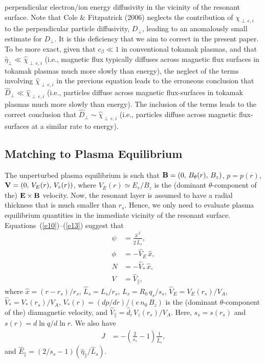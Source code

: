\documentclass[12pt,prb,aps]{revtex4-1}
\begin{document}
perpendicular electron/ion  energy diffusivity in the vicinity of the resonant surface. 
Note that Cole \& Fitzpatrick (2006) neglects the contribution of $\chi_{\perp\,e,i}$ to the perpendicular particle
diffusivity, $D_\perp$, leading to an anomalously small estimate for $D_\perp$. It is this deficiency that we aim to
correct in the present paper. To be more exact, given that $c_\beta\ll 1$ in conventional tokamak plasmas, and
that $\hat{\eta}_\perp\ll \hat{\chi}_{\perp\,e,i}$ (i.e., magnetic flux typically diffuses  across magnetic flux surfaces in tokamak plasmas much more
slowly than energy), the neglect of the terms involving $\hat{\chi}_{\perp\,e,i}$ in the previous equation leads to the
erroneous conclusion that $\hat{D}_\perp\ll \hat{\chi}_{\perp\,e,i}$ (i.e., particles diffuse across magnetic flux-surfaces in tokamak plasmas 
much more slowly than energy). The inclusion of the terms leads to the correct conclusion that  $\hat{D}_\perp\sim \hat{\chi}_{\perp\,e,i}$ (i.e., particles diffuse across magnetic flux-surfaces 
at a similar rate to energy). 

\subsection{Matching to Plasma Equilibrium}
The unperturbed plasma equilibrium is such that
${\bf B} = (0,\,B_\theta(r),\,B_z)$,  $p = p(r)$,
${\bf V} = (0,\,V_E(r),\,V_z(r))$,
where 
$V_E(r)\simeq E_r/B_z$
 is the (dominant $\theta$-component of the) ${\bf E}\times {\bf B}$ velocity. Now, the resonant layer is assumed to have a radial thickness that is
much smaller than $r_s$.   Hence, we only need to evaluate plasma equilibrium quantities in the immediate vicinity of the resonant
surface. Equations~(\ref{e10})--(\ref{e13}) suggest that 
\begin{align}
\psi&= \frac{\hat{x}^{\,2}}{2\,\hat{L}_s},\label{e23}\\[0.5ex]
\phi &= - \hat{V}_E\,\hat{x},\\[0.5ex]
N &= -\hat{V}_\ast\,\hat{x},\\[0.5ex]
V &= \hat{V}_\parallel,\label{e26}
\end{align}
where 
$\hat{x}=(r-r_s)/r_s$,
 $\hat{L}_s=L_s/r_s$,  $L_s=R_0\,q_s/s_s$, 
  $\hat{V}_E= V_E(r_s)/V_A$,
$\hat{V}_\ast= V_\ast(r_s)/V_A$,
$V_\ast(r) = (dp/dr)/(e\,n_0\,B_z)$ 
is the (dominant $\theta$-component of the) diamagnetic velocity,
  and 
 $\hat{V}_\parallel=\hat{d}_i\, V_z(r_s)/V_A$. Here, $s_s=s(r_s)$ and $s(r)=d\ln q/d\ln r$. We also have
 \begin{align}\label{e28}
 J &= -\left(\frac{2}{s_s}-1\right)\frac{1}{\hat{L}_s},
\end{align} 
and $ \hat{E}_\parallel =(2/s_s-1) (\hat{\eta}_\parallel/\hat{L}_s)$.
\end{document}
